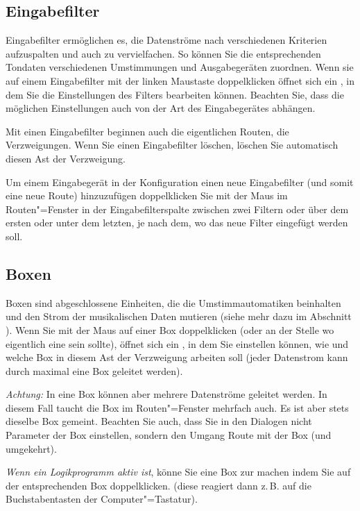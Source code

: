 \subsection{Eingabefilter}\label{sec:eingabefilter}

Eingabefilter ermöglichen es, die Datenströme nach verschiedenen Kriterien 
aufzuspalten und auch zu vervielfachen. So können Sie die entsprechenden 
Tondaten verschiedenen Umstimmungen und Ausgabegeräten zuordnen. 
Wenn sie auf einem Eingabefilter mit der linken Maustaste doppelklicken 
öffnet sich ein , in dem Sie die Einstellungen 
des Filters bearbeiten können. Beachten Sie, dass die möglichen 
Einstellungen auch von der Art des Eingabegerätes abhängen.


Mit einen Eingabefilter beginnen auch die eigentlichen Routen, 
die Verzweigungen. Wenn Sie einen Eingabefilter löschen, löschen 
Sie automatisch diesen Ast der Verzweigung.


Um einem Eingabegerät in der Konfiguration einen neue Eingabefilter 
(und somit eine neue Route) hinzuzufügen doppelklicken Sie 
mit der Maus im Routen"=Fenster in der Eingabefilterspalte zwischen 
zwei Filtern oder über dem ersten oder unter dem letzten, je 
nach dem, wo das neue Filter eingefügt werden soll.

\subsection{Boxen}\label{sec:boxen}


Boxen sind abgeschlossene Einheiten, die die Umstimmautomatiken 
beinhalten und den Strom der musikalischen Daten mutieren (siehe 
mehr dazu im Abschnitt ). Wenn Sie mit 
der Maus auf einer Box doppelklicken (oder an der Stelle wo eigentlich 
eine sein sollte), öffnet sich ein , in dem 
Sie einstellen können, wie und welche Box in diesem Ast der 
Verzweigung arbeiten soll (jeder Datenstrom kann durch maximal 
eine Box geleitet werden).


\emph{Achtung:} In eine Box können aber mehrere Datenströme 
geleitet werden. In diesem Fall taucht die Box im Routen"=Fenster 
mehrfach auch. Es ist aber stets dieselbe Box gemeint. Beachten 
Sie auch, dass Sie in den Dialogen nicht Parameter der Box einstellen, 
sondern den Umgang Route mit der Box (und umgekehrt).


\emph{Wenn ein Logikprogramm aktiv ist}, könne Sie eine Box 
zur  machen indem Sie auf der 
entsprechenden Box doppelklicken. (diese reagiert dann z.\,B. auf 
die Buchstabentasten der Computer"=Tastatur).

